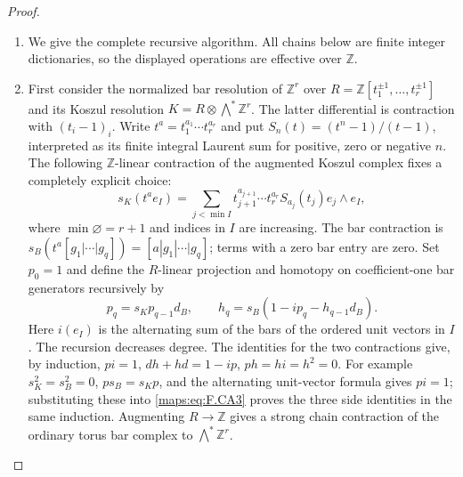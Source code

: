 \documentclass[11pt,a4paper]{article}
\theoremstyle{definition}
\begin{document}
\begin{proof}
\begin{enumerate}[label=\arabic*.]
\item We give the complete recursive algorithm.  All chains below are
finite integer dictionaries, so the displayed operations are
effective over $\mathbb Z$.

\item First consider the normalized bar resolution of $\mathbb Z^r$
over $R=\mathbb Z[t_1^{\pm1},\ldots,t_r^{\pm1}]$ and its Koszul
resolution $K=R\otimes\bigwedge^*\mathbb Z^r$.
The latter differential is contraction with $(t_i-1)_i$.
Write $t^a=t_1^{a_1}\cdots t_r^{a_r}$ and put
$S_n(t)=(t^n-1)/(t-1)$, interpreted as its finite integral
Laurent sum for positive, zero or negative $n$.
The following $\mathbb Z$-linear contraction of the augmented
Koszul complex fixes a completely explicit choice:
\[
 s_K(t^a e_I)=
 \sum_{j<\min I}
 t_{j+1}^{a_{j+1}}\cdots t_r^{a_r}S_{a_j}(t_j)
 e_j\wedge e_I,                                           \tag{F.CA2}\label{maps:eq:F.CA2}
\]
where $\min\varnothing=r+1$ and indices in $I$ are increasing.
The bar contraction is
$s_B(t^a[g_1|\cdots|g_q])=[a|g_1|\cdots|g_q]$; terms with a
zero bar entry are zero.  Set $p_0=1$ and define the
$R$-linear projection and homotopy on coefficient-one bar
generators recursively by
\[
 p_q=s_Kp_{q-1}d_B,
 \qquad
 h_q=s_B(1-ip_q-h_{q-1}d_B).                               \tag{F.CA3}\label{maps:eq:F.CA3}
\]
Here $i(e_I)$ is the alternating sum of the bars of the ordered
unit vectors in $I$.  The recursion decreases degree.  The
identities for the two contractions give, by induction,
$pi=1$, $dh+hd=1-ip$, $ph=hi=h^2=0$.
For example $s_K^2=s_B^2=0$, $ps_B=s_Kp$, and the alternating
unit-vector formula gives $pi=1$; substituting these into
\eqref{maps:eq:F.CA3} proves the three side identities in the same induction.
Augmenting $R\to\mathbb Z$ gives a strong chain contraction
of the ordinary torus bar complex to $\bigwedge^*\mathbb Z^r$.


\end{enumerate}
\end{proof}
\end{document}
